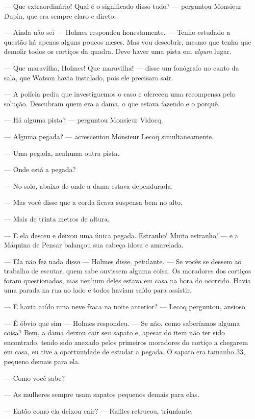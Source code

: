 --- Que extraordinário! Qual é o significado disso tudo? --- perguntou
Monsieur Dupin, que era sempre claro e direto.

--- Ainda não sei --- Holmes respondeu honestamente. --- Tenho estudado
a questão há apenas alguns poucos meses. Mas vou descobrir, mesmo que
tenha que demolir todos os cortiços da quadra. Deve haver uma pista em
\emph{algum} lugar.

--- Que maravilha, Holmes! Que maravilha! --- disse um fonógrafo no
canto da sala, que Watson havia instalado, pois ele precisara sair.

--- A polícia pediu que investiguemos o caso e ofereceu uma recompensa
pela solução. Descubram quem era a dama, o que estava fazendo e o
porquê.

--- Há alguma pista? --- perguntou Monsieur Vidocq.

--- Alguma pegada? --- acrescentou Monsieur Lecoq simultaneamente.

--- Uma pegada, nenhuma outra pista.

--- Onde está a pegada?

--- No solo, abaixo de onde a dama estava dependurada.

--- Mas você disse que a corda ficava suspensa bem no alto.

--- Mais de trinta metros de altura.

--- E ela desceu e deixou uma única pegada. Estranho! Muito estranho!
--- e a Máquina de Pensar balançou sua cabeça idosa e amarelada.

--- Ela não fez nada disso --- Holmes disse, petulante. --- Se vocês se
dessem ao trabalho de escutar, quem sabe ouvissem alguma coisa. Os
moradores dos cortiços foram questionados, mas nenhum deles estava em
casa na hora do ocorrido. Havia uma parada na rua ao lado e todos haviam
saído para assistir.

--- E havia caído uma neve fraca na noite anterior? --- Lecoq perguntou,
ansioso.

--- É óbvio que sim --- Holmes respondeu. --- Se não, como saberíamos
alguma coisa? Bem, a dama deixou cair seu sapato e, apesar do item não
ter sido encontrado, tendo sido anexado pelos primeiros moradores do
cortiço a chegarem em casa, eu tive a oportunidade de estudar a pegada.
O sapato era tamanho 33, pequeno demais para ela.

--- Como você sabe?

--- As mulheres sempre usam sapatos pequenos demais para elas.

--- Então como ela deixou cair? --- Raffles retrucou, triunfante.

